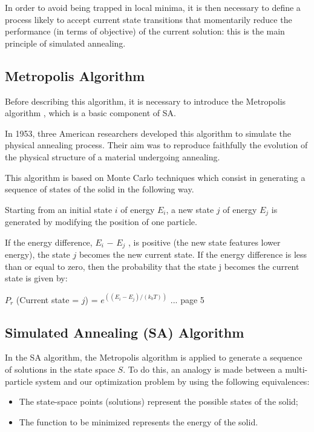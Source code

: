 \documentclass[conference]{IEEEtran}
\begin{document}
In order to avoid being trapped in local minima, it is then necessary to define a process likely to accept current state transitions that momentarily reduce the performance (in terms of objective) of the current solution: this is the main principle of
simulated annealing.

\subsection{Metropolis Algorithm}
Before describing this algorithm, it is necessary to introduce the Metropolis algorithm \cite{b6}, which is a basic component of SA.

In 1953, three American researchers developed this algorithm to simulate the physical annealing process. Their aim was to reproduce faithfully the evolution of the physical structure of a material undergoing annealing.

This algorithm is based on Monte Carlo techniques which consist in generating a sequence of states of the solid in the following way.

Starting from an initial state $i$ of energy $E_{i}$, a new state $j$ of energy $E_{j}$ is generated by modifying the position of one particle.

If the energy difference, $E_{i}$ − $E_{j}$ , is positive (the new state features lower energy), the state $j$ becomes the new current state. If the energy difference is less than or equal to zero, then the probability that the state j becomes the current state is given by:

$P_{r}$ (Current state = $j$) = $e^((E_i-E_j)/(k_bT))$
...
page 5

\subsection{Simulated Annealing (SA) Algorithm}

In the SA algorithm, the Metropolis algorithm is applied to generate a sequence of solutions in the state space $S$. To do this, an analogy is made between a multi-particle system and our optimization problem by using the following equivalences:

\begin{itemize}
    \item The state-space points (solutions) represent the possible states of the solid;
    \item The function to be minimized represents the energy of the solid.
\end{itemize}
\end{document}

